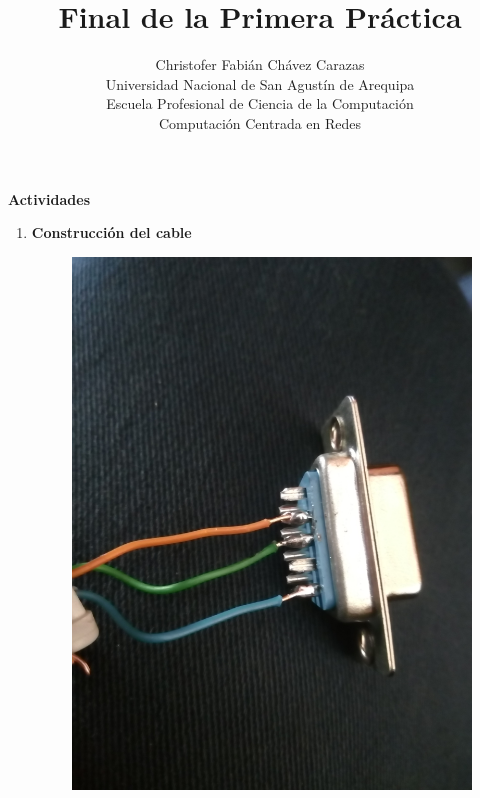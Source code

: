 \documentclass[a4paper,12pt]{article}
\begin{document}
\title{Final de la Primera Práctica}
\author{
Christofer Fabián Chávez Carazas \\
\small{Universidad Nacional de San Agustín de Arequipa} \\
\small{Escuela Profesional de Ciencia de la Computación} \\
\small{Computación Centrada en Redes}
}
\date{}

\maketitle

\begin{large}
 \textbf{Actividades}
\end{large}

\begin{enumerate}
 \item \textbf{Construcción del cable}
 \begin{figure}[H]
  \centering
  \includegraphics[scale = 0.05]{1.jpg}

\end{figure}
\end{enumerate}
\end{document}
